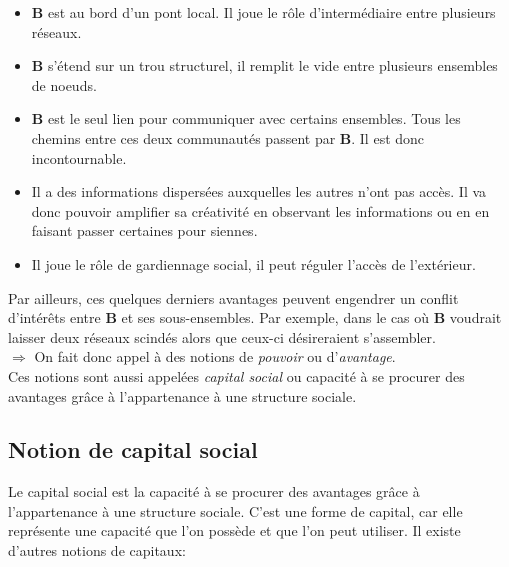 \begin{itemize}
\item \textbf{B} est au bord d'un pont local. Il joue le rôle d'intermédiaire entre plusieurs réseaux.
\item \textbf{B} s'étend sur un trou structurel, il remplit le vide entre plusieurs ensembles de noeuds.
\item \textbf{B} est le seul lien pour communiquer avec certains ensembles. Tous les chemins entre ces deux communautés passent par \textbf{B}. Il est donc incontournable.
\item Il a des informations dispersées auxquelles les autres n'ont pas accès. Il va donc pouvoir amplifier sa créativité en observant les informations ou en en faisant passer certaines pour siennes.
\item Il joue le rôle de gardiennage social, il peut réguler l'accès de l'extérieur.\\
\end{itemize}

Par ailleurs, ces quelques derniers avantages peuvent engendrer un conflit d'intérêts entre \textbf{B} et ses sous-ensembles. Par exemple, dans le cas où \textbf{B} voudrait laisser deux réseaux scindés alors que ceux-ci désireraient s'assembler.\\

$\Rightarrow$ On fait donc appel à des notions de \textit{pouvoir} ou d'\textit{avantage}.\\

Ces notions sont aussi appelées \textit{capital social} ou capacité à se procurer des avantages grâce à l'appartenance à une structure sociale.

%

\subsection{Notion de capital social}
Le capital social est la capacité à se procurer des avantages grâce à l'appartenance à une structure sociale. C'est une forme de capital, car elle représente une capacité que l'on possède et que l'on peut utiliser.  
Il existe d'autres notions de capitaux:\\

